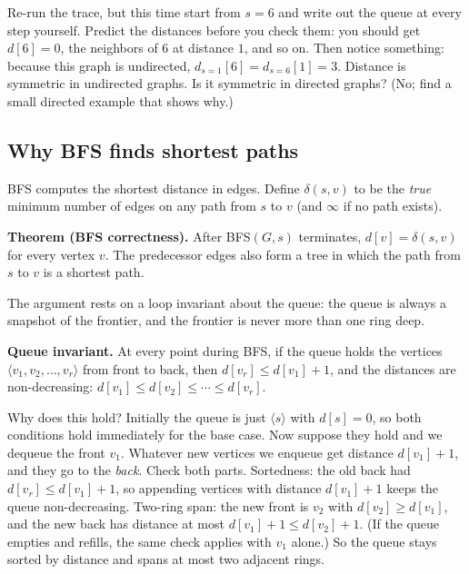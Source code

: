 \begin{labbox}
Re-run the trace, but this time start from $s = 6$ and write out the queue at
every step yourself. Predict the distances before you check them: you should get
$d[6]=0$, the neighbors of $6$ at distance $1$, and so on. Then notice something:
because this graph is undirected, $d_{s=1}[6] = d_{s=6}[1] = 3$. Distance is
symmetric in undirected graphs. Is it symmetric in directed graphs? (No; find a
small directed example that shows why.)
\end{labbox}

\subsection{Why BFS finds shortest paths}
\label{ch22:bfs-correctness}

BFS computes the shortest distance in edges. Define $\delta(s, v)$ to be the \emph{true} minimum
number of edges on any path from $s$ to $v$ (and $\infty$ if no path exists).

\begin{formalbox}
\textbf{Theorem (BFS correctness).} After BFS$(G, s)$ terminates, $d[v] =
\delta(s, v)$ for every vertex $v$. The predecessor edges also form a tree in
which the path from $s$ to $v$ is a shortest path.
\end{formalbox}

The argument rests on a loop invariant about the queue: the queue is always a
snapshot of the frontier, and the frontier is never more than one ring deep.

\begin{formalbox}
\textbf{Queue invariant.} At every point during BFS, if the queue holds the
vertices $\langle v_1, v_2, \ldots, v_r \rangle$ from front to back, then
$d[v_r] \le d[v_1] + 1$, and the distances are non-decreasing:
$d[v_1] \le d[v_2] \le \cdots \le d[v_r]$.
\end{formalbox}

Why does this hold? Initially the queue is just $\langle s \rangle$ with
$d[s]=0$, so both conditions hold immediately for the base case. Now suppose they hold and we dequeue the
front $v_1$. Whatever new vertices we enqueue get distance $d[v_1]+1$, and they
go to the \emph{back}. Check both parts. Sortedness: the old back had
$d[v_r] \le d[v_1]+1$, so appending vertices with distance $d[v_1]+1$ keeps the
queue non-decreasing. Two-ring span: the new front is $v_2$ with
$d[v_2] \ge d[v_1]$, and the new back has distance at most
$d[v_1]+1 \le d[v_2]+1$. (If the queue empties and refills, the same check
applies with $v_1$ alone.) So the queue stays sorted by distance and spans at
most two adjacent rings.

